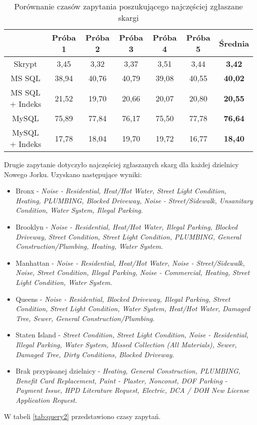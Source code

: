 \documentclass[a4paper,11pt]{article}
\begin{document}
\begin{table}[h!]
\begin{center}
\caption{Porównanie czasów zapytania poszukującego najczęściej zgłaszane skargi}
\label{tab:query1}
\begin{tabular}{|c|c|c|c|c|c|c|}
\hline
 & Próba 1 & Próba 2 & Próba 3 & Próba 4 & Próba 5 & \textbf{Średnia} \\ \hline
Skrypt & 3,45 & 3,32 & 3,37 & 3,51 & 3,44 & \textbf{3,42} \\ \hline
MS SQL & 38,94 & 40,76 & 40,79 & 39,08 & 40,55 & \textbf{40,02} \\ \hline
MS SQL + Indeks & 21,52 & 19,70 & 20,66 & 20,07 & 20,80 & \textbf{20,55} \\ \hline
MySQL & 75,89 & 77,84 & 76,17 & 75,50 & 77,78 & \textbf{76,64} \\ \hline
MySQL + Indeks & 17,78 & 18,04 & 19,70 & 19,72 & 16,77 & \textbf{18,40} \\ \hline
\end{tabular}
\end{center}
\end{table}

Drugie zapytanie dotyczyło najczęściej zgłaszanych skarg dla każdej dzielnicy Nowego Jorku. Uzyskano następujące wyniki:
\begin{itemize}
    \item Bronx - \textit{Noise - Residential, Heat/Hot Water, Street Light Condition, Heating, PLUMBING, Blocked Driveway, Noise - Street/Sidewalk, Unsanitary Condition, Water System, Illegal Parking}.
    \item Brooklyn - \textit{Noise - Residential, Heat/Hot Water, Illegal Parking, Blocked Driveway, Street Condition, Street Light Condition, PLUMBING, General Construction/Plumbing, Heating, Water System}.  
    \item Manhattan - \textit{Noise - Residential, Heat/Hot Water, Noise - Street/Sidewalk, Noise, Street Condition, Illegal Parking, Noise - Commercial, Heating, Street Light Condition, Water System}.
    \item Queens - \textit{Noise - Residential, Blocked Driveway, Illegal Parking, Street Condition, Street Light Condition, Water System, Heat/Hot Water, Damaged Tree, Sewer, General Construction/Plumbing}.
    \item Staten Island - \textit{Street Condition, Street Light Condition, Noise - Residential, Illegal Parking, Water System, Missed Collection (All Materials), Sewer, Damaged Tree, Dirty Conditions, Blocked Driveway}.
    \item Brak przypisanej dzielnicy - \textit{Heating, General Construction, PLUMBING, Benefit Card Replacement, Paint - Plaster, Nonconst, DOF Parking - Payment Issue, HPD Literature Request, Electric, DCA / DOH New License Application Request}.
\end{itemize}
W tabeli \ref{tab:query2} przedstawiono czasy zapytań.
\end{document}
